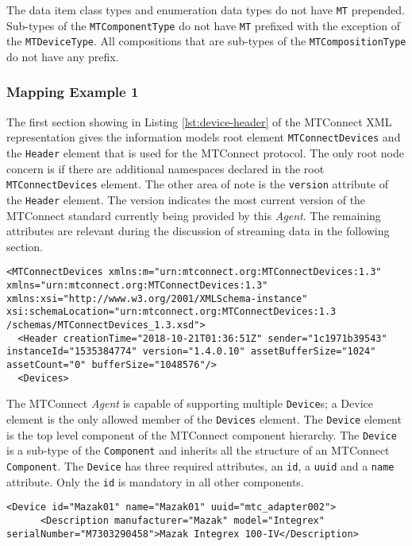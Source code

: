 The data item class types and enumeration data types do not have \texttt{MT} prepended. Sub-types of the \texttt{MTComponentType} do not have \texttt{MT} prefixed with the exception of the \texttt{MTDeviceType}. All compositions that are sub-types of the \texttt{MTCompositionType} do not have any prefix.

\subsubsection{Mapping Example 1}

The first section showing in Listing \ref{lst:device-header} of the MTConnect XML representation gives the information models root element \texttt{MTConnectDevices} and the \texttt{Header} element that is used for the MTConnect protocol. The only root node concern is if there are additional namespaces declared in the root \texttt{MTConnectDevices} element. The other area of note is the \texttt{version} attribute of the \texttt{Header} element.  The version indicates the most current version of the MTConnect standard currently being provided by this \textit{Agent}. The remaining attributes are relevant during the discussion of streaming data in the following section.

\begin{lstlisting}[caption={Device Header},label={lst:device-header}]
<MTConnectDevices xmlns:m="urn:mtconnect.org:MTConnectDevices:1.3" xmlns="urn:mtconnect.org:MTConnectDevices:1.3" xmlns:xsi="http://www.w3.org/2001/XMLSchema-instance" xsi:schemaLocation="urn:mtconnect.org:MTConnectDevices:1.3 /schemas/MTConnectDevices_1.3.xsd">
  <Header creationTime="2018-10-21T01:36:51Z" sender="1c1971b39543" instanceId="1535384774" version="1.4.0.10" assetBufferSize="1024" assetCount="0" bufferSize="1048576"/>
  <Devices>
\end{lstlisting}

The MTConnect \textit{Agent} is capable of supporting multiple \texttt{Device}s; a Device element is the only allowed member of the \texttt{Devices} element. The \texttt{Device} element is the top level component of the MTConnect component hierarchy. The \texttt{Device} is a sub-type of the \texttt{Component} and inherits all the structure of an MTConnect \texttt{Component}. The \texttt{Device} has three required attributes, an \texttt{id}, a \texttt{uuid} and a \texttt{name} attribute. Only the \texttt{id} is mandatory in all other components. 

\begin{lstlisting}[firstnumber=last,%
    caption={\texttt{Device} Element Mapping},label={lst:device-model-device}]
    <Device id="Mazak01" name="Mazak01" uuid="mtc_adapter002">
      <Description manufacturer="Mazak" model="Integrex" serialNumber="M7303290458">Mazak Integrex 100-IV</Description>
\end{lstlisting}

